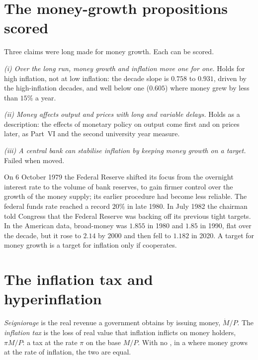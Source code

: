 \section{The money-growth propositions scored}\label{sec:b1:money-and-inflation:scored}

Three claims were long made for money growth. Each can be scored.

\emph{(i) Over the long run, money growth and inflation move one for one.}
Holds for high inflation, not at low inflation: the decade slope is $0.758$
to $0.931$, driven by the high-inflation decades, and well below one
($0.605$) where money grew by less than $15\%$ a year. %

\emph{(ii) Money affects output and prices with long and variable delays.}
Holds as a description: the effects of monetary policy on output come
first and on prices later, as Part~VI and the second university year
measure.

\emph{(iii) A central bank can stabilise inflation by keeping money growth
on a target.} Failed when  moved.

\begin{record}
On 6 October 1979 the Federal Reserve shifted its focus from the
overnight interest rate to the volume of bank reserves, to gain firmer
control over the growth of the money supply; its earlier procedure had
become less reliable. The federal funds rate reached a record $20\%$ in late
1980. In July 1982 the chairman told Congress that the Federal Reserve was
backing off its previous tight targets. %
In the American data, broad-money  was $1.855$ in 1980 and $1.85$ in
1990, flat over the decade, but it rose to $2.14$ by 2000 and then fell to
$1.182$ in 2020. %
A target for money growth is a target for inflation only if 
cooperates.
\end{record}

\section{The inflation tax and hyperinflation}\label{sec:b1:money-and-inflation:tax}

\begin{definition}\label{def:b1:money-and-inflation:seigniorage}
\emph{Seigniorage} is the real revenue a government obtains by issuing
money, $\dot M/P$. The \emph{inflation tax} is the loss of real value that
inflation inflicts on money holders, $\pi M/P$: a tax at the rate $\pi$ on the
base $M/P$. With no , in a  where money grows at the
rate of inflation, the two are equal.
\end{definition}

